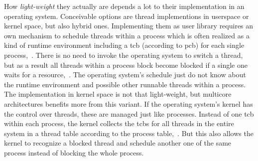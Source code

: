 How \textit{light-weight} they actually are depends a lot to their implementation in an operating system.
Conceivable options are thread implementions in userspace or kernel space, but also hybrid ones. 
Implementing them as user library requires an own mechanism to schedule threads within a process which is often realized as a kind of runtime environment including a \ac{tcb} (according to \ac{pcb}) for each single process\cite{mandl2014Grundkurs},~\cite{tanenbaum-modern-operating-systems}.
There is no need to invoke the operating system to switch a thread, but as a result all threads within a process block become blocked if a single one waits for a resource\cite{tanenbaum-modern-operating-systems},~\cite{brause2017betriebssysteme}. 
The operating system's schedule just do not know about the runtime environment and possible other runnable threads within a process.
The implementation in kernel space is not that light-weight, but multicore architectures benefits more from this variant.
If the operating system's kernel has the control over threads, these are managed just like processes.
Instead of one \ac{tcb} within each process, the kernel collects the \acp{tcb} for all threads in the entire system in a thread table according to the process table\cite{tanenbaum-modern-operating-systems},~\cite{mandl2014Grundkurs}.
But this also allows the kernel to recognize a blocked thread and schedule another one of the same process instead of blocking the whole process\cite{tanenbaum-modern-operating-systems}.


